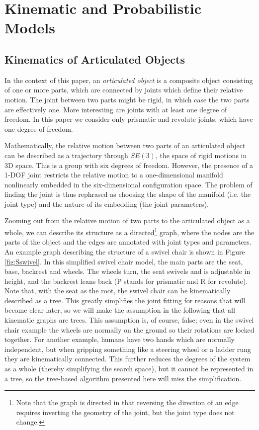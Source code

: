 \documentclass[letterpaper, 10 pt, conference]{ieeeconf}  %
\begin{document}
\section{Kinematic and Probabilistic Models} \label{sec:models}

\subsection{Kinematics of Articulated Objects}
In the context of this paper, an \emph{articulated object} is a composite object consisting of one or more parts, which are connected by joints which define their relative motion. The joint between two parts might be rigid, in which case the two parts are effectively one. More interesting are joints with at least one degree of freedom. In this paper we consider only prismatic and revolute joints, which have one degree of freedom.

Mathematically, the relative motion between two parts of an articulated object can be described as a trajectory through $SE(3)$, the space of rigid motions in 3D space. This is a group with six degrees of freedom. However, the presence of a 1-DOF joint restricts the relative motion to a one-dimensional manifold nonlinearly embedded in the six-dimensional configuration space. The problem of finding the joint is thus rephrased as choosing the shape of the manifold (i.e. the joint type) and the nature of its embedding (the joint parameters).

Zooming out from the relative motion of two parts to the articulated object as a whole, we can describe its structure as a directed\footnote{Note that the graph is directed in that reversing the direction of an edge requires inverting the geometry of the joint, but the joint type does not change.} graph, where the nodes are the parts of the object and the edges are annotated with joint types and parameters. An example graph describing the structure of a swivel chair is shown in Figure \ref{fig:Sswivel}. In this simplified swivel chair model, the main parts are the seat, base, backrest and wheels. The wheels turn, the seat swivels and is adjustable in height, and the backrest leans back (P stands for prismatic and R for revolute). Note that, with the seat as the root, the swivel chair can be kinematically described as a tree. This greatly simplifies the joint fitting for reasons that will become clear later, so we will make the assumption in the following that all kinematic graphs are trees. This assumption is, of course, false; even in the swivel chair example the wheels are normally on the ground so their rotations are locked together. For another example, humans have two hands which are normally independent, but when gripping something like a steering wheel or a ladder rung they are kinematically connected. This further reduces the degrees of the system as a whole (thereby simplifying the search space), but it cannot be represented in a tree, so the tree-based algorithm presented here will miss the simplification.
\end{document}
